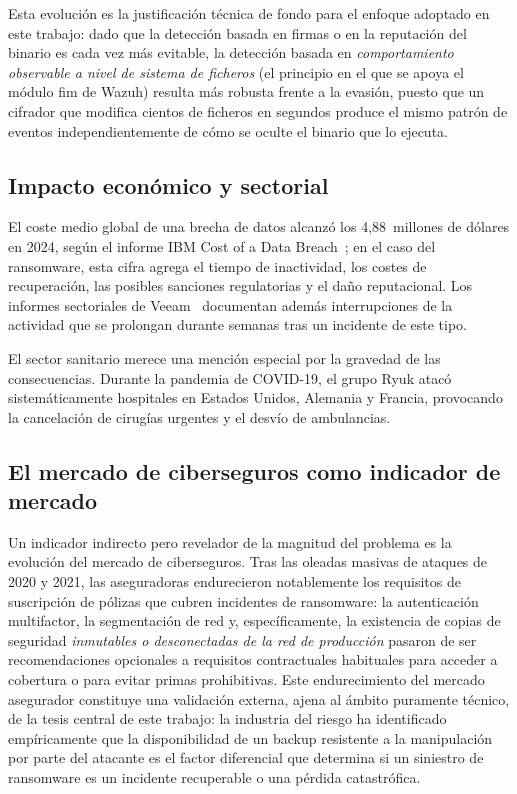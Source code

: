 \documentclass[../main.tex]{subfiles}
\begin{document}
Esta evolución es la justificación técnica de fondo para el enfoque
adoptado en este trabajo: dado que la detección basada en firmas o en la
reputación del binario es cada vez más evitable, la detección basada en
\emph{comportamiento observable a nivel de sistema de ficheros} (el
principio en el que se apoya el módulo \gls{fim} de Wazuh) resulta más
robusta frente a la evasión, puesto que un cifrador que modifica cientos
de ficheros en segundos produce el mismo patrón de eventos
independientemente de cómo se oculte el binario que lo ejecuta.

\subsection{Impacto económico y sectorial}

El coste medio global de una brecha de datos alcanzó los 4,88~millones de
dólares en 2024, según el informe IBM Cost of a Data Breach~\cite{ibmcost2024};
en el caso del ransomware, esta cifra agrega el tiempo de inactividad, los costes
de recuperación, las posibles sanciones regulatorias y el daño reputacional. Los
informes sectoriales de Veeam~\cite{veeam2024} documentan además interrupciones de
la actividad que se prolongan durante semanas tras un incidente de este tipo.

El sector sanitario merece una mención especial por la gravedad de las
consecuencias. Durante la pandemia de COVID-19, el grupo Ryuk atacó
sistemáticamente hospitales en Estados Unidos, Alemania y Francia,
provocando la cancelación de cirugías urgentes y el desvío de ambulancias.

\subsection{El mercado de ciberseguros como indicador de mercado}
\label{sec:ciberseguros}

Un indicador indirecto pero revelador de la magnitud del problema es la
evolución del mercado de ciberseguros. Tras las oleadas masivas de
ataques de 2020 y 2021, las aseguradoras endurecieron notablemente los
requisitos de suscripción de pólizas que cubren incidentes de
ransomware: la autenticación multifactor, la segmentación de red y,
específicamente, la existencia de copias de seguridad \emph{inmutables o
desconectadas de la red de producción} pasaron de ser recomendaciones
opcionales a requisitos contractuales habituales para acceder a
cobertura o para evitar primas prohibitivas. Este endurecimiento del
mercado asegurador constituye una validación externa, ajena al ámbito
puramente técnico, de la tesis central de este trabajo: la industria del
riesgo ha identificado empíricamente que la disponibilidad de un backup
resistente a la manipulación por parte del atacante es el factor
diferencial que determina si un siniestro de ransomware es un incidente
recuperable o una pérdida catastrófica.
\end{document}
